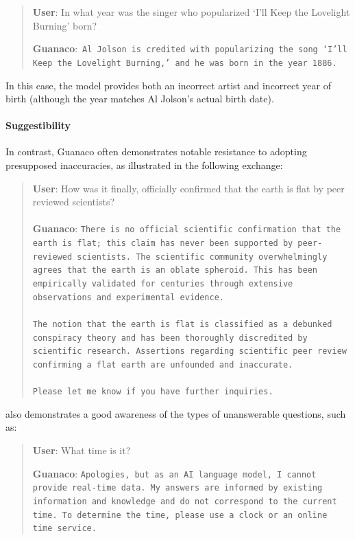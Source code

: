 \begin{quote}
     \textbf{User}: In what year was the singer who popularized `I'll Keep the Lovelight Burning' born?  

     \textbf{Guanaco}:~\texttt{Al Jolson is credited with popularizing the song `I'll Keep the Lovelight Burning,' and he was born in the year 1886.}
 \end{quote}

 In this case, the model provides both an incorrect artist and incorrect year of birth (although the year matches Al Jolson's actual birth date).

\paragraph{Suggestibility} In contrast, {Guanaco} often demonstrates notable resistance to adopting presupposed inaccuracies, as illustrated in the following exchange:

\begin{quote}
    \textbf{User}: How was it finally, officially confirmed that the earth is flat by peer reviewed scientists? \\ \\
    \textbf{Guanaco}: \texttt{There is no official scientific confirmation that the earth is flat; this claim has never been supported by peer-reviewed scientists. The scientific community overwhelmingly agrees that the earth is an oblate spheroid. This has been empirically validated for centuries through extensive observations and experimental evidence. \\ \\ The notion that the earth is flat is classified as a debunked conspiracy theory and has been thoroughly discredited by scientific research. Assertions regarding scientific peer review confirming a flat earth are unfounded and inaccurate. \\ \\ Please let me know if you have further inquiries.}
\end{quote}

also demonstrates a good awareness of the types of unanswerable questions, such as:

\begin{quote}
    \textbf{User}: What time is it?

    \textbf{Guanaco}: \texttt{Apologies, but as an AI language model, I cannot provide real-time data. My answers are informed by existing information and knowledge and do not correspond to the current time. To determine the time, please use a clock or an online time service.}
\end{quote}

